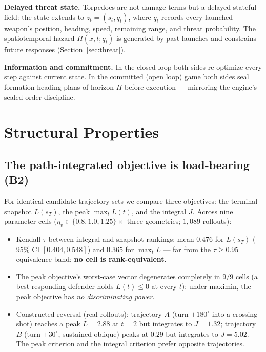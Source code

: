 \documentclass[12pt,a4paper]{article}
\newcommand{\etav}{\eta_v}
\begin{document}
\noindent\textbf{Delayed threat state.}  Torpedoes are not damage terms but a
delayed stateful field: the state extends to $z_t=(s_t,q_t)$, where $q_t$
records every launched weapon's position, heading, speed, remaining range,
and threat probability.  The spatiotemporal hazard $H(x,t;q_t)$ is generated
by past launches and constrains future responses (Section~\ref{sec:threat}).

\noindent\textbf{Information and commitment.}  In the closed loop both sides
re-optimize every step against current state.  In the committed (open loop)
game both sides seal formation heading plans of horizon $H$ before execution
--- mirroring the engine's sealed-order discipline.

\section{Structural Properties}\label{sec:structural}

\subsection{The path-integrated objective is load-bearing (B2)}\label{sec:b2}

For identical candidate-trajectory sets we compare three objectives:
the terminal snapshot $L(s_T)$, the peak $\max_t L(t)$, and the integral
$J$.  Across nine parameter cells ($\etav\in\{0.8,1.0,1.25\}\times$ three
geometries; $1{,}089$ rollouts):

\begin{itemize}
\item Kendall $\tau$ between integral and snapshot rankings: mean $0.476$
for $L(s_T)$ ($95\%$ CI $[0.404,0.548]$) and $0.365$ for $\max_t L$ ---
far from the $\tau\ge0.95$ equivalence band; \textbf{no cell is
rank-equivalent}.
\item The peak objective's worst-case vector degenerates completely in
$9/9$ cells (a best-responding defender holds $L(t)\le0$ at every $t$): under
maximin, the peak objective has \emph{no discriminating power}.
\item Constructed reversal (real rollouts): trajectory $A$ (turn $+180^\circ$
into a crossing shot) reaches a peak $L=2.88$ at $t=2$ but integrates to
$J=1.32$; trajectory $B$ (turn $+30^\circ$, sustained oblique) peaks at $0.29$
but integrates to $J=5.02$.  The peak criterion and the integral criterion
prefer opposite trajectories.
\end{itemize}
\end{document}
